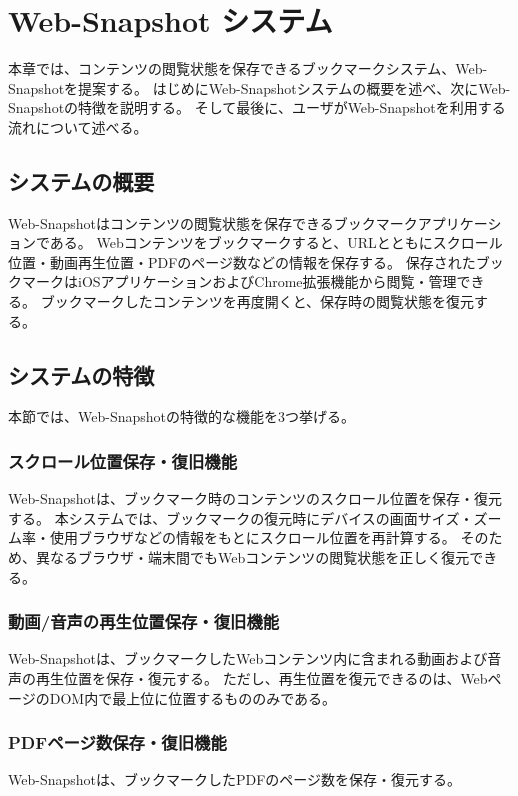 \chapter{Web-Snapshot システム}
\label{chap:web_snapshot_system}
本章では、コンテンツの閲覧状態を保存できるブックマークシステム、Web-Snapshotを提案する。
はじめにWeb-Snapshotシステムの概要を述べ、次にWeb-Snapshotの特徴を説明する。
そして最後に、ユーザがWeb-Snapshotを利用する流れについて述べる。

\section{システムの概要}
Web-Snapshotはコンテンツの閲覧状態を保存できるブックマークアプリケーションである。
Webコンテンツをブックマークすると、URLとともにスクロール位置・動画再生位置・PDFのページ数などの情報を保存する。
保存されたブックマークはiOSアプリケーションおよびChrome拡張機能から閲覧・管理できる。
ブックマークしたコンテンツを再度開くと、保存時の閲覧状態を復元する。

\section{システムの特徴}
本節では、Web-Snapshotの特徴的な機能を3つ挙げる。

\subsection{スクロール位置保存・復旧機能}
Web-Snapshotは、ブックマーク時のコンテンツのスクロール位置を保存・復元する。
本システムでは、ブックマークの復元時にデバイスの画面サイズ・ズーム率・使用ブラウザなどの情報をもとにスクロール位置を再計算する。
そのため、異なるブラウザ・端末間でもWebコンテンツの閲覧状態を正しく復元できる。

\subsection{動画/音声の再生位置保存・復旧機能}
Web-Snapshotは、ブックマークしたWebコンテンツ内に含まれる動画および音声の再生位置を保存・復元する。
ただし、再生位置を復元できるのは、WebページのDOM内で最上位に位置するもののみである。

\subsection{PDFページ数保存・復旧機能}
Web-Snapshotは、ブックマークしたPDFのページ数を保存・復元する。

